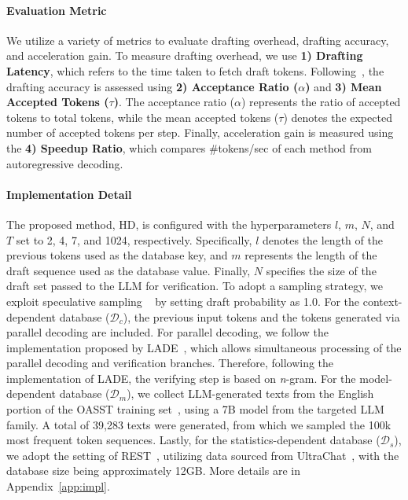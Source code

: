 % 

\paragraph{Evaluation Metric} 
We utilize a variety of metrics to evaluate drafting overhead, drafting accuracy, and acceleration gain. To measure drafting overhead, we use \textbf{1) Drafting Latency}, which refers to the time taken to fetch draft tokens. Following~\citet{DistilSpec}, the drafting accuracy is assessed using \textbf{2) Acceptance Ratio (\(\alpha\))} and \textbf{3) Mean Accepted Tokens (\(\tau\))}. The acceptance ratio (\(\alpha\)) represents the ratio of accepted tokens to total tokens, while the mean accepted tokens (\(\tau\)) denotes the expected number of accepted tokens per step. Finally, acceleration gain is measured using the \textbf{4) Speedup Ratio}, which compares \#tokens/sec of each method from autoregressive decoding.


\paragraph{Implementation Detail}
The proposed method, HD, is configured with the hyperparameters \(l\), \(m\), \(N\), and \(T\) set to 2, 4, 7, and 1024, respectively. 
Specifically, \(l\) denotes the length of the previous tokens used as the database key, and \(m\) represents the length of the draft sequence used as the database value. Finally, \(N\) specifies the size of the draft set passed to the LLM for verification. 
To adopt a sampling strategy, we exploit speculative sampling ~\cite{SpecSampling} by setting draft probability as 1.0.
For the context-dependent database (\(\mathcal{D}_c\)), the previous input tokens and the tokens generated via parallel decoding are included. 
For parallel decoding, we follow the implementation proposed by LADE~\cite{LAD}, which allows simultaneous processing of the parallel decoding and verification branches.
Therefore, following the implementation of LADE, the verifying step is based on \textit{n}-gram.
For the model-dependent database (\(\mathcal{D}_m\)), we collect LLM-generated texts from the English portion of the OASST training set~\cite{OASST}, using a 7B model from the targeted LLM family.
A total of 39,283 texts were generated, from which we sampled the 100k most frequent token sequences.
Lastly, for the statistics-dependent database (\(\mathcal{D}_s\)), we adopt the setting of REST~\cite{REST}, utilizing data sourced from UltraChat~\cite{UltraChat}, with the database size being approximately 12GB.
More details are in Appendix~\ref{app:impl}.

